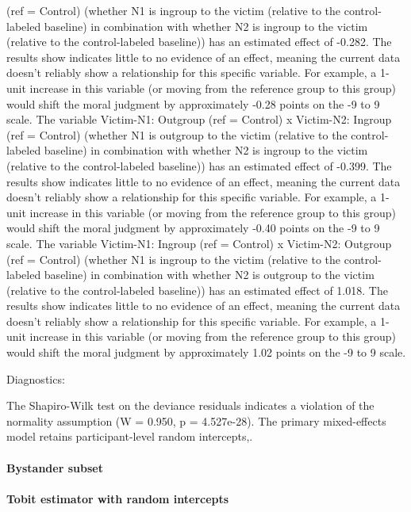 \documentclass[11pt]{article}
\begin{document}
(ref = Control) (whether N1 is ingroup to the victim (relative to the control-labeled baseline) in combination with whether N2 is ingroup to the victim (relative to the control-labeled baseline)) has an estimated effect of -0.282. The results show indicates little to no evidence of an effect, meaning the current data doesn't reliably show a relationship for this specific variable. For example, a 1-unit increase in this variable (or moving from the reference group to this group) would shift the moral judgment by approximately -0.28 points on the -9 to 9 scale. The variable Victim-N1: Outgroup (ref = Control) x Victim-N2: Ingroup (ref = Control) (whether N1 is outgroup to the victim (relative to the control-labeled baseline) in combination with whether N2 is ingroup to the victim (relative to the control-labeled baseline)) has an estimated effect of -0.399. The results show indicates little to no evidence of an effect, meaning the current data doesn't reliably show a relationship for this specific variable. For example, a 1-unit increase in this variable (or moving from the reference group to this group) would shift the moral judgment by approximately -0.40 points on the -9 to 9 scale. The variable Victim-N1: Ingroup (ref = Control) x Victim-N2: Outgroup (ref = Control) (whether N1 is ingroup to the victim (relative to the control-labeled baseline) in combination with whether N2 is outgroup to the victim (relative to the control-labeled baseline)) has an estimated effect of 1.018. The results show indicates little to no evidence of an effect, meaning the current data doesn't reliably show a relationship for this specific variable. For example, a 1-unit increase in this variable (or moving from the reference group to this group) would shift the moral judgment by approximately 1.02 points on the -9 to 9 scale.

Diagnostics:

The Shapiro-Wilk test on the deviance residuals indicates a violation of the normality assumption (W = 0.950, p = 4.527e-28). The primary mixed-effects model retains participant-level random intercepts,.


\paragraph{Bystander subset}

\paragraph{Tobit estimator with random intercepts}
\end{document}
